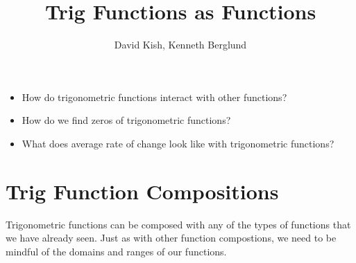 \documentclass{ximera}
\author{David Kish, Kenneth Berglund}
\title{Trig Functions as Functions}
\begin{document}
\begin{abstract}
  
\end{abstract}
\maketitle



\begin{motivatingQuestions}
\begin{itemize}
\item How do trigonometric functions interact with other functions?
\item How do we find zeros of trigonometric functions?
\item What does average rate of change look like with trigonometric functions?
\end{itemize}
\end{motivatingQuestions}
\section{Trig Function Compositions}

Trigonometric functions can be composed with any of the types of functions that we have already seen. Just as with other function compostions, we need to be mindful of the domains and ranges of our functions.
\end{document}

